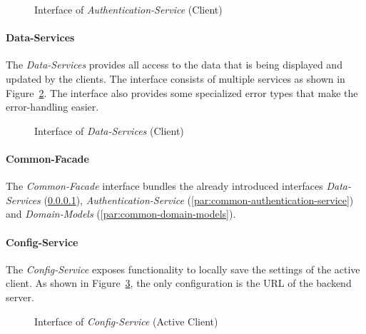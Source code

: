 \begin{figure}
    \centering

    \caption{Interface of \textit{Authentication-Service} (Client)}
    \label{fig:common-authentication-service}
\end{figure}

\paragraph{Data-Services}\label{par:common-data-services}
The \textit{Data-Services} provides all access to the data that is being displayed and updated by the clients.
The interface consists of multiple services as shown in Figure~\ref{fig:common-data-services}. \newline
The interface also provides some specialized error types that make the error-handling easier.

\begin{figure}
    \centering

    \caption{Interface of \textit{Data-Services} (Client)}
    \label{fig:common-data-services}
\end{figure}

\paragraph{Common-Facade}
The \textit{Common-Facade} interface bundles the already introduced interfaces \textit{Data-Services} (\ref{par:common-data-services}), \textit{Authentication-Service} (\ref{par:common-authentication-service}) and \textit{Domain-Models} (\ref{par:common-domain-models}).

\paragraph{Config-Service}\label{par:active-config-service}
The \textit{Config-Service} exposes functionality to locally save the settings of the active client.
As shown in Figure~\ref{fig:active-config-service}, the only configuration is the URL of the backend server.

\begin{figure}
    \centering

    \caption{Interface of \textit{Config-Service} (Active Client)}
    \label{fig:active-config-service}
\end{figure}

